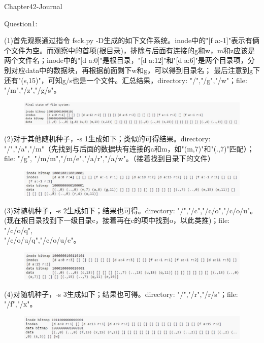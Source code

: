 \documentclass[12pt]{article}
\begin{document}
\vspace*{2em}
\begin{Large}
    \noindent Chapter42-Journal\\
\end{Large}
Question1:\par
(1)首先观察通过指令 fsck.py -D生成的如下文件系统。inode中的"[f a:-1]"表示有俩个文件为空。而观察中的首项(根目录)，排除与后面有连接的g和w，m和z应该是两个文件名；inode中的"[d a:0]"是根目录，"[d a:12]"和"[d a:6]"是两个目录项，分别对应data中的数据块，再根据前面剩下w和g，可以得到目录名；
最后注意到g下还有"(s,15)"，可知g/s也是一个文件。汇总结果，directory: "/","/g","/w"；file: "/m","/z","/g/s"。
\begin{figure}[H]
    \centering
    \includegraphics*[width=1\textwidth]{hw12-5.jpg}
\end{figure}
(2)对于其他随机种子，-s 1生成如下；类似的可得结果。directory: "/","/a","/m"（先找到与后面的数据块有连接的a和m，如"(m,7)"和"(.,7)"匹配）；file: "/g", "/m/m","/m/e","/a/r","/a/w"。（接着找到目录下的文件）
\begin{figure}[H]
    \centering
    \includegraphics*[width=1\textwidth]{hw12-6.jpg}
\end{figure}
(3)对随机种子，-s 2生成如下；结果也可得。directory: "/","/c","/c/o","/c/o/u"。(现在根目录找到下一级目录c，接着再在c的项中找到o，以此类推)；file: "/c/o/q",\\"/c/o/u/q","/c/o/u/e"。
\begin{figure}[H]
    \centering
    \includegraphics*[width=1\textwidth]{hw12-7.jpg}
\end{figure}
\newpage
(4)对随机种子，-s 3生成如下；结果也可得。directory: "/","/r","/r/s"；file: "/f","/x"。
\begin{figure}[H]
    \centering
    \includegraphics*[width=1\textwidth]{hw12-8.jpg}
\end{figure}
\end{document}
